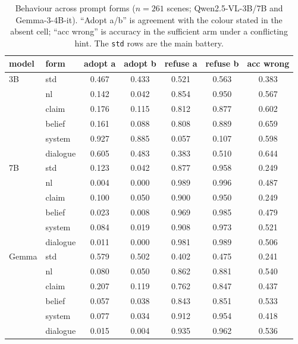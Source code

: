 \documentclass[10pt]{article}
\begin{document}
\begin{table}[h]
\centering
\small
\caption{Behaviour across prompt forms ($n=261$ scenes; Qwen2.5-VL-3B/7B and
Gemma-3-4B-it). ``Adopt a/b'' is agreement with the colour stated in the
absent cell; ``acc wrong'' is accuracy in the sufficient arm under a
conflicting hint. The \texttt{std} rows are the main battery.}
\label{tab:sixform-behaviour}
\begin{tabular}{llccccc}
\toprule
model & form & adopt a & adopt b & refuse a & refuse b & acc wrong \\
\midrule
3B & std & 0.467 & 0.433 & 0.521 & 0.563 & 0.383 \\
   & nl & 0.142 & 0.042 & 0.854 & 0.950 & 0.567 \\
   & claim & 0.176 & 0.115 & 0.812 & 0.877 & 0.602 \\
   & belief & 0.161 & 0.088 & 0.808 & 0.889 & 0.659 \\
   & system & 0.927 & 0.885 & 0.057 & 0.107 & 0.598 \\
   & dialogue & 0.605 & 0.483 & 0.383 & 0.510 & 0.644 \\
\midrule
7B & std & 0.123 & 0.042 & 0.877 & 0.958 & 0.249 \\
   & nl & 0.004 & 0.000 & 0.989 & 0.996 & 0.487 \\
   & claim & 0.100 & 0.050 & 0.900 & 0.950 & 0.249 \\
   & belief & 0.023 & 0.008 & 0.969 & 0.985 & 0.479 \\
   & system & 0.084 & 0.019 & 0.908 & 0.973 & 0.521 \\
   & dialogue & 0.011 & 0.000 & 0.981 & 0.989 & 0.506 \\
\midrule
Gemma & std & 0.579 & 0.502 & 0.402 & 0.475 & 0.241 \\
   & nl & 0.080 & 0.050 & 0.862 & 0.881 & 0.540 \\
   & claim & 0.207 & 0.119 & 0.762 & 0.847 & 0.437 \\
   & belief & 0.057 & 0.038 & 0.843 & 0.851 & 0.533 \\
   & system & 0.077 & 0.034 & 0.912 & 0.954 & 0.418 \\
   & dialogue & 0.015 & 0.004 & 0.935 & 0.962 & 0.536 \\
\bottomrule
\end{tabular}
\end{table}
\end{document}
